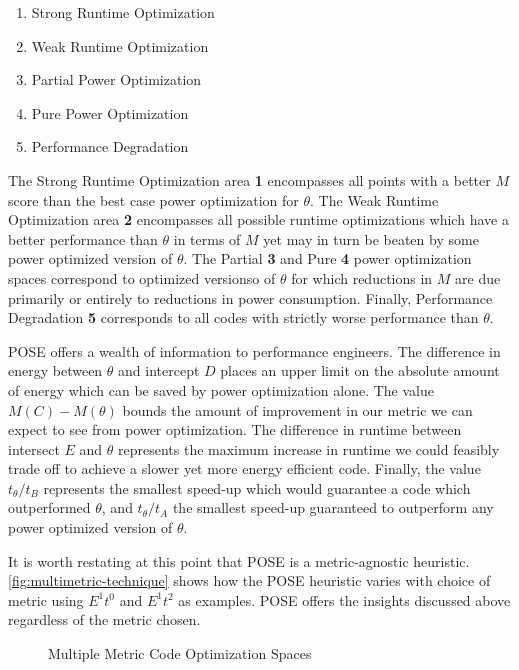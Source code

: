 \begin{enumerate}
\item Strong Runtime Optimization
\item Weak Runtime Optimization
\item Partial Power Optimization
\item Pure Power Optimization
\item Performance Degradation
\end{enumerate}

The Strong Runtime Optimization area \textbf{1} encompasses all points with a better $M$ score than the best case power optimization for $\theta$. The Weak Runtime Optimization area \textbf{2} encompasses all possible runtime optimizations which have a better performance than $\theta$ in terms of $M$ yet may in turn be beaten by some power optimized version of $\theta$. The Partial \textbf{3} and Pure \textbf{4} power optimization spaces correspond to optimized versionso of $\theta$ for which reductions in $M$ are due primarily or entirely to reductions in power consumption.
Finally, Performance Degradation \textbf{5} corresponds to all codes with strictly worse performance than $\theta$.


POSE offers a wealth of information to performance engineers.
The difference in energy between $\theta$ and intercept $D$ places an upper limit on the absolute amount of energy which can be saved by power optimization alone.
The value $M(C) - M(\theta)$ bounds the amount of improvement in our metric we can expect to see from power optimization.
The difference in runtime between intersect $E$ and $\theta$ represents the maximum increase in runtime we could feasibly trade off to achieve a slower yet more energy efficient code.
Finally, the value $t_\theta / t_B$ represents the smallest speed-up which would guarantee a code which outperformed $\theta$, and $t_\theta / t_A$ the smallest speed-up guaranteed to outperform any power optimized version of $\theta$.

It is worth restating at this point that POSE is a metric-agnostic heuristic. \autoref{fig:multimetric-technique} shows how the POSE heuristic varies with choice of metric using $E^1t^0$ and $E^1t^2$ as examples. POSE offers the insights discussed above regardless of the metric chosen.

\begin{figure}
\centering

\caption{Multiple Metric Code Optimization Spaces}
\label{fig:multimetric-technique}
\end{figure}
